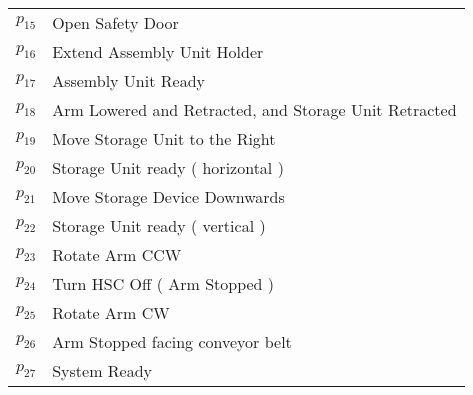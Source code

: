 \begin{longtable}{M{5cm}M{10cm}}
\hyperlink{partialNet:p15}{\hypertarget{partialTable:p15}{$p_{15}$}} & Open Safety Door\\
\hyperlink{partialNet:p16}{\hypertarget{partialTable:p16}{$p_{16}$}} & Extend Assembly Unit Holder\\
\hyperlink{partialNet:p17}{\hypertarget{partialTable:p17}{$p_{17}$}} & Assembly Unit Ready\\
\hyperlink{partialNet:p18}{\hypertarget{partialTable:p18}{$p_{18}$}} & Arm Lowered and Retracted, and Storage Unit Retracted\\
\hyperlink{partialNet:p19}{\hypertarget{partialTable:p19}{$p_{19}$}} & Move Storage Unit to the Right\\
\hyperlink{partialNet:p20}{\hypertarget{partialTable:p20}{$p_{20}$}} & Storage Unit ready ( horizontal )\\
\hyperlink{partialNet:p21}{\hypertarget{partialTable:p21}{$p_{21}$}} & Move Storage Device Downwards\\
\hyperlink{partialNet:p22}{\hypertarget{partialTable:p22}{$p_{22}$}} & Storage Unit ready ( vertical )\\
\hyperlink{partialNet:p23}{\hypertarget{partialTable:p23}{$p_{23}$}} & Rotate Arm CCW\\
\hyperlink{partialNet:p24}{\hypertarget{partialTable:p24}{$p_{24}$}} & Turn HSC Off ( Arm Stopped )\\
\hyperlink{partialNet:p25}{\hypertarget{partialTable:p25}{$p_{25}$}} & Rotate Arm CW\\
\hyperlink{partialNet:p26}{\hypertarget{partialTable:p26}{$p_{26}$}} & Arm Stopped facing conveyor belt\\
\hyperlink{partialNet:p27}{\hypertarget{partialTable:p27}{$p_{27}$}} & System Ready\\
\end{longtable}
